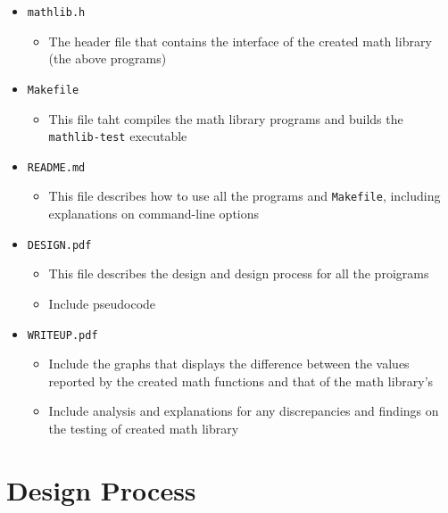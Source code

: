 \documentclass[12pt]{article}
\begin{document}
\begin{itemize}
\begin{itemize}
   \end{itemize}
   \item \texttt{mathlib.h}
   \begin{itemize}
     \item The header file that contains the interface of the created math library (the above programs) 
   \end{itemize}
   \item \texttt{Makefile}
   \begin{itemize}
     \item This file taht compiles the math library programs and builds the \texttt{mathlib-test} executable
   \end{itemize}
   \item \texttt{README.md}
   \begin{itemize}
     \item This file describes how to use all the programs and \texttt{Makefile}, including explanations on command-line options
   \end{itemize}
   \item \texttt{DESIGN.pdf}
   \begin{itemize}
     \item This file describes the design and design process for all the proigrams
     \item Include pseudocode
   \end{itemize}
   \item \texttt{WRITEUP.pdf}
   \begin{itemize}
     \item Include the graphs that displays the difference between the values reported by the created math functions and that of the math library’s
     \item Include analysis and explanations for any discrepancies and findings on the testing of created math library
   \end{itemize}
 \end{itemize}

\section{Design Process}
\end{document}
